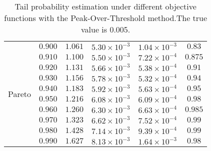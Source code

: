 \begin{table}[ht]
{\begin{tabular}{cc|cccc}
\multirow{10}{*}{Pareto}&$0.900$ & $1.061$ & $5.30\times 10^{-3}$ & $1.04\times 10^{-3}$ & $0.83$\\
&$0.910$ & $1.100$ & $5.50\times 10^{-3}$ & $7.22\times 10^{-4}$ & $0.875$\\
&$0.920$ & $1.131$ & $5.66\times 10^{-3}$ & $5.38\times 10^{-4}$ & $0.91$\\
&$0.930$ & $1.156$ & $5.78\times 10^{-3}$ & $5.32\times 10^{-4}$ & $0.94$\\
&$0.940$ & $1.183$ & $5.92\times 10^{-3}$ & $5.63\times 10^{-4}$ & $0.95$\\
&$0.950$ & $1.216$ & $6.08\times 10^{-3}$ & $6.09\times 10^{-4}$ & $0.98$\\
&$0.960$ & $1.260$ & $6.30\times 10^{-3}$ & $6.63\times 10^{-4}$ & $0.985$\\
&$0.970$ & $1.323$ & $6.62\times 10^{-3}$ & $7.52\times 10^{-4}$ & $0.99$\\
&$0.980$ & $1.428$ & $7.14\times 10^{-3}$ & $9.39\times 10^{-4}$ & $0.99$\\
&$0.990$ & $1.627$ & $8.13\times 10^{-3}$ & $1.64\times 10^{-3}$ & $0.98$\\
    \hline
    \bottomrule
    \end{tabular}}\caption{Tail probability estimation under different objective functions with the Peak-Over-Threshold method.The true value is 0.005.}
    \label{tb5_tpe}
\end{table}